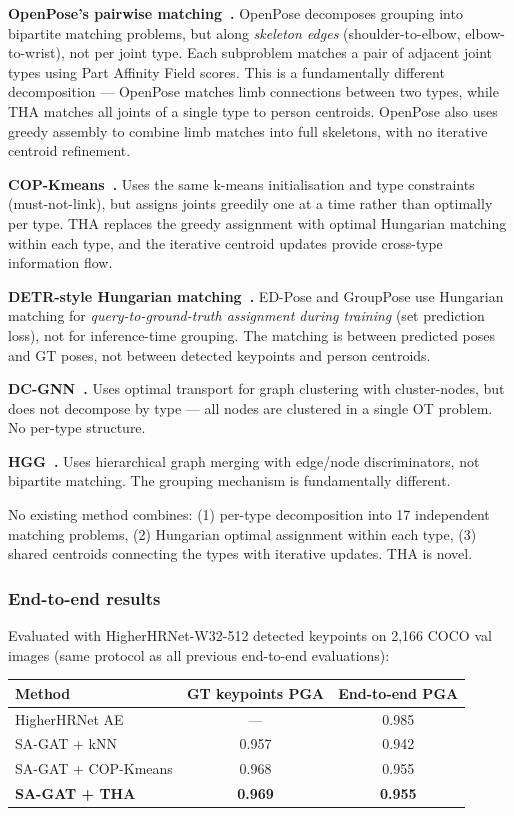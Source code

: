 \textbf{OpenPose's pairwise matching~\cite{cao2017openpose}.} OpenPose decomposes grouping into bipartite matching problems, but along \emph{skeleton edges} (shoulder-to-elbow, elbow-to-wrist), not per joint type. Each subproblem matches a pair of adjacent joint types using Part Affinity Field scores. This is a fundamentally different decomposition --- OpenPose matches limb connections between two types, while THA matches all joints of a single type to person centroids. OpenPose also uses greedy assembly to combine limb matches into full skeletons, with no iterative centroid refinement.

\textbf{COP-Kmeans~\cite{wagstaff2001copkmeans}.} Uses the same k-means initialisation and type constraints (must-not-link), but assigns joints greedily one at a time rather than optimally per type. THA replaces the greedy assignment with optimal Hungarian matching within each type, and the iterative centroid updates provide cross-type information flow.

\textbf{DETR-style Hungarian matching~\cite{yang2023edpose, liu2023grouppose}.} ED-Pose and GroupPose use Hungarian matching for \emph{query-to-ground-truth assignment during training} (set prediction loss), not for inference-time grouping. The matching is between predicted poses and GT poses, not between detected keypoints and person centroids.

\textbf{DC-GNN~\cite{dong2024dcgnn}.} Uses optimal transport for graph clustering with cluster-nodes, but does not decompose by type --- all nodes are clustered in a single OT problem. No per-type structure.

\textbf{HGG~\cite{jin2020hgg}.} Uses hierarchical graph merging with edge/node discriminators, not bipartite matching. The grouping mechanism is fundamentally different.

No existing method combines: (1) per-type decomposition into 17 independent matching problems, (2) Hungarian optimal assignment within each type, (3) shared centroids connecting the types with iterative updates. THA is novel.

\subsubsection{End-to-end results}

Evaluated with HigherHRNet-W32-512 detected keypoints on 2,166 COCO val images (same protocol as all previous end-to-end evaluations):

\begin{tabular}{lcc}
\hline
\textbf{Method} & \textbf{GT keypoints PGA} & \textbf{End-to-end PGA} \\
\hline
HigherHRNet AE & --- & 0.985 \\
SA-GAT + kNN & 0.957 & 0.942 \\
SA-GAT + COP-Kmeans & 0.968 & 0.955 \\
\textbf{SA-GAT + THA} & \textbf{0.969} & \textbf{0.955} \\
\hline
\end{tabular}


